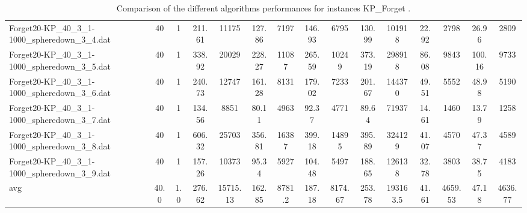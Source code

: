 \begin{table}[!ht]
{\begin{tabular}{lcccccccccccccc}
Forget20-KP\_40\_3\_1-1000\_spheredown\_3\_4.dat & 40 & 1 & 211.61 & 11175 & 127.86 & 7197 & 146.93 & 6795 & 130.99 & 101918 & 22.92 & 2798 & 26.96 & 2809 \\
Forget20-KP\_40\_3\_1-1000\_spheredown\_3\_5.dat & 40 & 1 & 338.92 & 20029 & 228.27 & 11087 & 265.59 & 10249 & 373.19 & 298918 & 86.08 & 9843 & 100.16 & 9733 \\
Forget20-KP\_40\_3\_1-1000\_spheredown\_3\_6.dat & 40 & 1 & 240.73 & 12747 & 161.28 & 8131 & 179.02 & 7233 & 201.67 & 144370 & 49.51 & 5552 & 48.98 & 5190 \\
Forget20-KP\_40\_3\_1-1000\_spheredown\_3\_7.dat & 40 & 1 & 134.56 & 8851 & 80.11 & 4963 & 92.37 & 4771 & 89.64 & 71937 & 14.61 & 1460 & 13.79 & 1258 \\
Forget20-KP\_40\_3\_1-1000\_spheredown\_3\_8.dat & 40 & 1 & 606.32 & 25703 & 356.81 & 16387 & 399.18 & 14895 & 395.89 & 324129 & 41.07 & 4570 & 47.37 & 4589 \\
Forget20-KP\_40\_3\_1-1000\_spheredown\_3\_9.dat & 40 & 1 & 157.26 & 10373 & 95.34 & 5927 & 104.48 & 5497 & 188.65 & 126138 & 32.78 & 3803 & 38.75 & 4183 \\
\hline avg & 40.0 & 1.0 &  276.62 & 15715.13 &  162.85 & 8781.2 &  187.18 & 8174.67 &  253.78 & 193163.5 &  41.61 & 4659.53 &  47.18 & 4636.77 \\ \hline
\bottomrule
\end{tabular}
}%
\caption{Comparison of the different algorithms performances for instances KP_Forget .}
\end{table}
